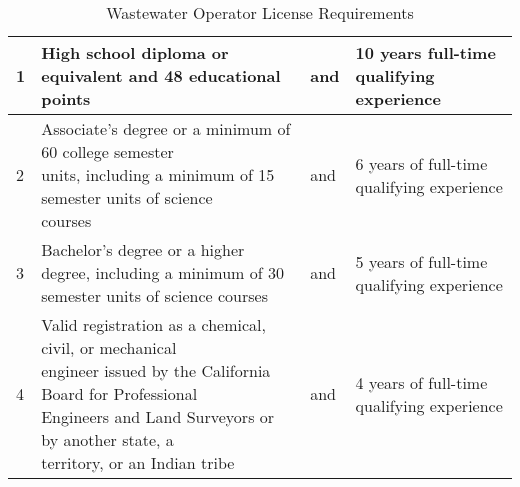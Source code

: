 \begin{table}[H]
\begin{tabular}{|l|p{6.5cm}|l|p{6.5cm}|}
1         & High  school  diploma    or  equivalent  and    48 educational points                                                                                                                                                                                                                         & and & 10      years      full-time      qualifying experience                                         \\ \hline
2         & \makecell[l]{Associate’s   degree   or     a  minimum   of     60 college semester \\units, including a minimum of 15 semester units of   science\\courses                                                                                                                                                   } & and & 6    years    of      full-time    qualifying   experience                                      \\ \hline
3         & Bachelor’s   degree   or     a   higher   degree, including a minimum of 30 semester   units of science courses                                                                                                                                                                               & and & 5    years    of      full-time    qualifying   experience                                      \\ \hline
4         & \makecell[l]{Valid  registration  as    a  chemical,  civil,    or mechanical\\ engineer issued by the California  Board  for    Professional\\  Engineers and Land    Surveyors or  by another  state,  a \\territory, or an Indian tribe} & and & 4    years    of      full-time    qualifying   experience                                      \\ \hline
\end{tabular}
\caption{Wastewater Operator License Requirements}
\end{table}

\newpage


